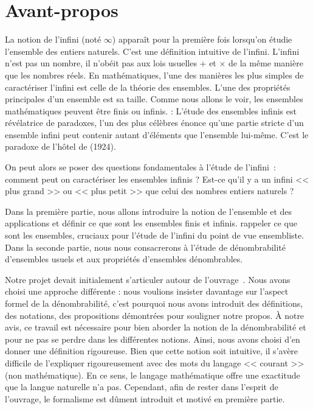 \documentclass[a4paper,french,final]{memoir}
\begin{document}
\begin{titlingpage}
\hypersetup{pageanchor=false}
  
\end{titlingpage}
\frontmatter
\tableofcontents
\chapter{Avant-propos}

La notion de l'infini (noté $\infty$) apparaît pour la première fois lorsqu'on étudie l'ensemble des entiers naturels. C'est une définition intuitive de l'infini. L'infini n'est pas un nombre, il n'obéit pas aux lois usuelles $+$ et $\times$ de la même manière que les nombres réels. En mathématiques, l'une des manières les plus simples de caractériser l'infini est celle de la théorie des ensembles. L'une des propriétés principales d'un ensemble est sa taille. Comme nous allons le voir, les ensembles mathématiques peuvent être finis ou infinis. : L'étude des ensembles infinis est révélatrice de paradoxes, l'un des plus célèbres  énonce qu'une partie stricte d'un ensemble infini peut contenir autant d'éléments que l'ensemble lui-même. C'est le paradoxe de l'hôtel de  (1924).

On peut alors se poser des questions fondamentales à l'étude de l'infini~: comment peut on caractériser les ensembles infinis ? Est-ce qu'il y a un infini << plus grand >> ou << plus petit >> que celui des nombres entiers naturels ?

Dans la première partie, nous allons introduire la notion de l'ensemble et des applications et définir ce que sont les ensembles finis et infinis. rappeler ce que sont les ensembles, cruciaux pour l'étude de l'infini du point de vue ensembliste.
Dans la seconde partie, nous nous consacrerons à l'étude de dénombrabilité d'ensembles usuels et aux propriétés d'ensembles dénombrables.

Notre projet devait initialement s'articuler autour de l'ouvrage~\cite{livre_ter}. Nous avons choisi une approche différente : nous voulions insister davantage sur l'aspect formel de la dénombrabilité, c'est pourquoi nous avons introduit des définitions, des notations, des propositions démontrées pour souligner notre propos. \`A notre avis, ce travail est nécessaire pour bien aborder la notion de la dénombrabilité et pour ne pas se perdre dans les différentes notions. Ainsi, nous avons choisi d'en donner une définition rigoureuse. Bien que cette notion soit intuitive, il s'avère difficile de l'expliquer rigoureusement avec des mots du langage << courant >> (non mathématique). En ce sens, le langage mathématique offre une exactitude que la langue naturelle n'a pas. Cependant, afin de rester dans l'esprit de l'ouvrage, le formalisme est dûment introduit et motivé en première partie.
\end{document}
